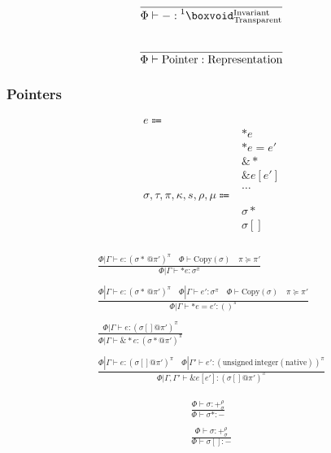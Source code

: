 \documentclass {article}
\begin{document}
\begin{gather*}
\frac
{}
{\Phi \vdash - : \prescript {1} {} \boxvoid^{\text{Invariant}}_{\text{Transparent}}} \\
\\
\frac
{}
{\Phi \vdash \text{Pointer} : \text{Representation}} \\
\end{gather*}

\subsubsection{Pointers}
\begin{align*}
e \Coloneqq & \\
& *e \tag{Read Pointer} \\
& *e = e' \tag{Write Pointer} \\
& \& * \tag{Array to Pointer} \\
& \& e [e'] \tag{Array Increment} \\
& \dots \\
\sigma, \tau, \pi, \kappa, s, \rho, \mu \Coloneqq & \\
& \sigma* \tag{Pointer} \\
& \sigma[] \tag{Array Pointer} \\
\end{align*}

\begin{gather*}
\frac
{\Phi | \Gamma \vdash e : (\sigma* \, @ \pi')^\pi \quad \Phi \vdash \text{Copy} (\sigma) \quad \pi \succeq \pi'}
{\Phi | \Gamma \vdash * e  : \sigma^\pi} \\
\\
\frac
{\Phi | \Gamma \vdash e : (\sigma* \, @ \pi')^\pi \quad \Phi | \Gamma \vdash e' : \sigma^\pi  \quad \Phi \vdash \text{Copy} (\sigma) \quad \pi \succeq \pi'}
{\Phi | \Gamma \vdash *e  = e' : ()^\pi } \\
\\
\frac
{\Phi | \Gamma \vdash e : (\sigma[] @ \pi') ^ \pi}
{\Phi | \Gamma \vdash \& * e : (\sigma * @ \pi') ^ \pi}\\
\\
\frac
{\Phi | \Gamma \vdash e : (\sigma [] @ \pi')^\pi \quad \Phi |
 \Gamma' \vdash e' : (\text{unsigned} \, \text{integer}(\text{native}))^\pi}
{\Phi | \Gamma, \Gamma' \vdash \&e [e'] : (\sigma [] @  \pi')^\pi}
\end{gather*}

\begin{gather*}
\frac
{\Phi \vdash \sigma : +^{\rho}_\sigma}
{\Phi \vdash \sigma* : -} \\
\\
\frac
{\Phi \vdash \sigma : +^{\rho}_\sigma}
{\Phi \vdash \sigma [] : -} \\
\end{gather*}
\end{document}

